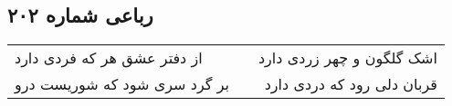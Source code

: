 \begin{center}
\section*{رباعی شماره ۲۰۲}
\label{sec:sh202}
\begin{longtable}{l p{0.5cm} r}
از دفتر عشق هر که فردی دارد
&&
اشک گلگون و چهر زردی دارد
\\
بر گرد سری شود که شوریست درو
&&
قربان دلی رود که دردی دارد
\\
\end{longtable}
\end{center}
